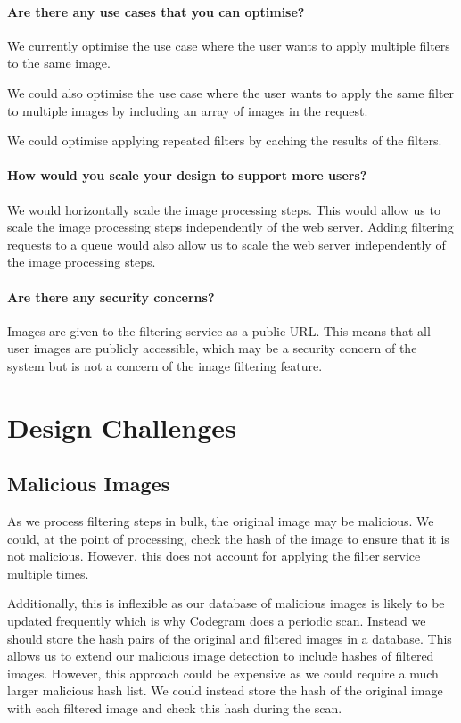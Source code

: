 \documentclass{csse4400}
\begin{document}
\paragraph{Are there any use cases that you can optimise?}
We currently optimise the use case where the user wants to apply multiple filters to the same image.

We could also optimise the use case where the user wants to apply the same filter to multiple images by including an array of images in the request.

We could optimise applying repeated filters by caching the results of the filters.

\paragraph{How would you scale your design to support more users?}
We would horizontally scale the image processing steps.
This would allow us to scale the image processing steps independently of the web server.
Adding filtering requests to a queue would also allow us to scale the web server independently of the image processing steps.

\paragraph{Are there any security concerns?}
Images are given to the filtering service as a public URL.
This means that all user images are publicly accessible,
which may be a security concern of the system but is not a concern of the image filtering feature.


\section{Design Challenges}

\subsection{Malicious Images}
As we process filtering steps in bulk,
the original image may be malicious.
We could, at the point of processing,
check the hash of the image to ensure that it is not malicious.
However, this does not account for applying the filter service multiple times.

Additionally, this is inflexible as our database of malicious images is likely to be updated frequently which is why Codegram does a periodic scan.
Instead we should store the hash pairs of the original and filtered images in a database.
This allows us to extend our malicious image detection to include hashes of filtered images.
However, this approach could be expensive as we could require a much larger malicious hash list.
We could instead store the hash of the original image with each filtered image and check this hash during the scan.
\end{document}
